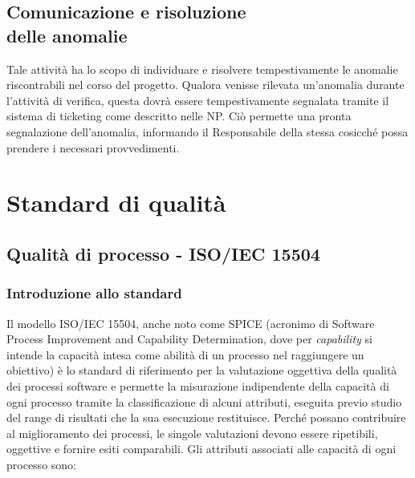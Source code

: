 \documentclass[openany,12pt,a4paper]{report}
\begin{document}
	\section{Comunicazione e risoluzione \\ delle anomalie}
	Tale attività ha lo scopo di individuare e risolvere tempestivamente le anomalie riscontrabili nel corso del progetto. Qualora venisse rilevata un'anomalia durante l'attività di verifica, questa dovrà essere tempestivamente segnalata tramite il sistema di ticketing come descritto nelle NP. Ciò permette una pronta segnalazione dell'anomalia, informando il Responsabile della stessa cosicché possa prendere i necessari provvedimenti.
\appendix


\chapter{Standard di qualità}


\section{Qualità di processo - ISO/IEC 15504}

\subsection{Introduzione allo standard}

Il modello ISO/IEC 15504, anche noto come SPICE (acronimo di Software Process Improvement and Capability Determination, dove per \textit{capability} si intende la capacità intesa come abilità di un processo nel raggiungere un obiettivo) è lo standard di riferimento per la valutazione oggettiva della qualità dei processi software e permette la misurazione indipendente della capacità di ogni processo tramite la classificazione di alcuni attributi, eseguita previo studio del range di risultati che la sua esecuzione restituisce. Perché possano contribuire al miglioramento dei processi, le singole valutazioni devono essere ripetibili, oggettive e fornire esiti comparabili. Gli attributi associati alle capacità di ogni processo sono:
\end{document}
